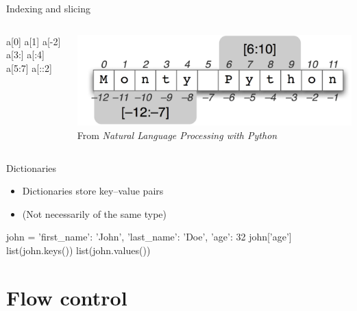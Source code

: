 \begin{frame}[fragile]{Indexing and slicing}
    \begin{columns}
        \begin{column}{0.2\textwidth}
            \begin{py3}
                a[0]
                a[1]
                a[-2]
                a[3:]
                a[:4]
                a[5:7]
                a[::2]
            \end{py3}
        \end{column}
        \begin{column}{0.8\textwidth}
            \begin{center}
                \includegraphics[width=\textwidth]{figures/py_str} \\
                {\scriptsize%
                 From \textit{Natural Language Processing with Python}}
            \end{center}
        \end{column}
    \end{columns}
\end{frame}

\begin{frame}[fragile]{Dictionaries}
    \begin{itemize}
        \item Dictionaries store \alert{key--value pairs}
        \item (Not necessarily of the same type)
    \end{itemize}
    \vfill
    \begin{py3}
        john = {
            'first_name': 'John',
            'last_name': 'Doe',
            'age': 32
        }
        john['age']
        list(john.keys())
        list(john.values())
    \end{py3}
\end{frame}

\section{Flow control}

